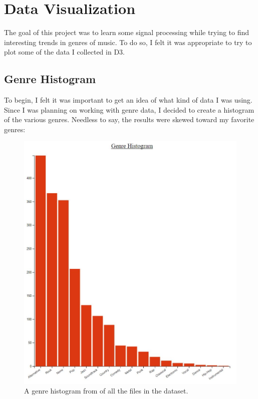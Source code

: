 \documentclass[journal]{vgtc}                %
\begin{document}
\section{Data Visualization}

The goal of this project was to learn some signal processing while trying to
find interesting trends in genres of music. To do so, I felt it was appropriate
to try to plot some of the data I collected in D3.

\subsection{Genre Histogram}

To begin, I felt it was important to get an idea of what kind of data I was
using. Since I was planning on working with genre data, I decided to create
a histogram of the various genres. Needless to say, the results were skewed
toward my favorite genres:

\begin{figure}[h]
 \centering %
 \includegraphics[width=\columnwidth]{genre-histogram}
 \caption{A genre histogram from \cite{Grifski:2019} of all the files in the dataset.}
 \label{fig:genres}
\end{figure}
\end{document}
